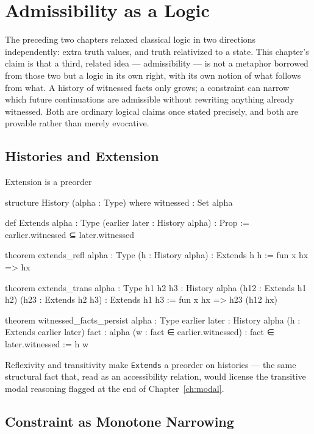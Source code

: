 \chapter{Admissibility as a Logic}
\label{ch:admissibility}

The preceding two chapters relaxed classical logic in two directions
independently: extra truth values, and truth relativized to a state.
This chapter's claim is that a third, related idea — admissibility —
is not a metaphor borrowed from those two but a logic in its own
right, with its own notion of what follows from what. A history of
witnessed facts only grows; a constraint can narrow which future
continuations are admissible without rewriting anything already
witnessed. Both are ordinary logical claims once stated precisely,
and both are provable rather than merely evocative.

\section{Histories and Extension}

\begin{experiment}{Extension is a preorder}
\begin{lean}
structure History (alpha : Type) where
  witnessed : Set alpha

def Extends {alpha : Type} (earlier later : History alpha) : Prop :=
  earlier.witnessed ⊆ later.witnessed

theorem extends_refl {alpha : Type} (h : History alpha) :
    Extends h h := fun x hx => hx

theorem extends_trans {alpha : Type} {h1 h2 h3 : History alpha}
    (h12 : Extends h1 h2) (h23 : Extends h2 h3) :
    Extends h1 h3 := fun x hx => h23 (h12 hx)

theorem witnessed_facts_persist {alpha : Type}
    {earlier later : History alpha}
    (h : Extends earlier later) {fact : alpha}
    (w : fact ∈ earlier.witnessed) : fact ∈ later.witnessed :=
  h w
\end{lean}
Reflexivity and transitivity make \texttt{Extends} a preorder on
histories — the same structural fact that, read as an accessibility
relation, would license the transitive modal reasoning flagged at
the end of Chapter~\ref{ch:modal}.
\end{experiment}

\section{Constraint as Monotone Narrowing}


